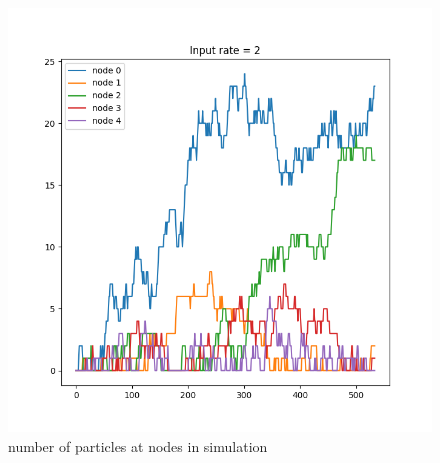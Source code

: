 \documentclass{article}
\begin{document}
\begin{figure}[!htbp]
    \centering
    \includegraphics[width=\linewidth]{fig/fix_2}   
    \caption{number of particles at nodes in simulation}
    \label{fig:figure9}
\end{figure}
\end{document}
